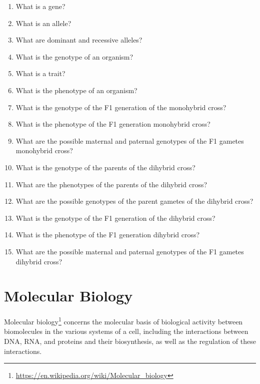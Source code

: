\documentclass[]{book}
\providecommand{\tightlist}{%
  \setlength{\itemsep}{0pt}\setlength{\parskip}{0pt}}
\let\rmarkdownfootnote\footnote%
\def\footnote{\protect\rmarkdownfootnote}
\renewcommand{\href}[2]{#2\footnote{\url{#1}}}
\theoremstyle{definition}
\theoremstyle{definition}
\theoremstyle{definition}
\theoremstyle{remark}
\begin{document}
\begin{enumerate}
\def\labelenumi{\arabic{enumi}.}
\tightlist
\item
  What is a gene?
\item
  What is an allele?
\item
  What are dominant and recessive alleles?
\item
  What is the genotype of an organism?
\item
  What is a trait?
\item
  What is the phenotype of an organism?
\item
  What is the genotype of the F1 generation of the monohybrid cross?
\item
  What is the phenotype of the F1 generation monohybrid cross?
\item
  What are the possible maternal and paternal genotypes of the F1
  gametes monohybrid cross?
\item
  What is the genotype of the parents of the dihybrid cross?
\item
  What are the phenotypes of the parents of the dihybrid cross?
\item
  What are the possible genotypes of the parent gametes of the dihybrid
  cross?
\item
  What is the genotype of the F1 generation of the dihybrid cross?
\item
  What is the phenotype of the F1 generation dihybrid cross?
\item
  What are the possible maternal and paternal genotypes of the F1
  gametes dihybrid cross?
\end{enumerate}

\chapter{Molecular Biology}\label{molecular-biology}

\href{https://en.wikipedia.org/wiki/Molecular_biology}{Molecular
biology} concerns the molecular basis of biological activity between
biomolecules in the various systems of a cell, including the
interactions between DNA, RNA, and proteins and their biosynthesis, as
well as the regulation of these interactions.
\end{document}
